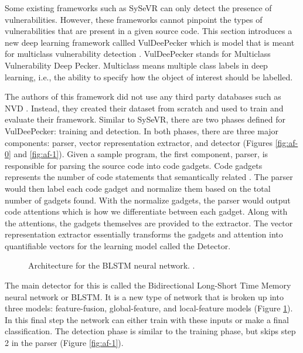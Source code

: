 \documentclass[12pt,twocolumn,letterpaper]{article}
\begin{document}
Some existing frameworks such as SySeVR can only detect the presence of vulnerabilities. However, these 
frameworks cannot pinpoint the types of vulnerabilities that are present in a given source code. This 
section introduces a new deep learning framework callled VulDeePecker which is model that is meant for 
multiclass vulnerability detection \cite{Zou21}.  VulDeePecker stands for Multiclass Vulnerability Deep Pecker.
Multiclass means multiple class labels in deep learning, i.e., the ability to specify how the object of interest 
should be labelled.

The authors of this framework did not use any third party databases such as NVD \cite{Nist00,Zou21}. Instead, 
they created their dataset from scratch and used to train and evaluate their framework. Similar to SySeVR, 
there are two phases defined for VulDeePecker: training and detection. In both phases, there are three major
components: parser, vector representation extractor, and detector (Figures \ref{fig:af-0} and \ref{fig:af-1}). 
Given a sample program, the first component, parser, is responsible for parsing the source code into code gadgets. 
Code gadgets represents the number of code statements that semantically related \cite{Zou21}. The parser would then 
label each code gadget and normalize them based on the total number of gadgets found. With the normalize gadgets, 
the parser would output code attentions which is how we differentiate between each gadget. Along with the attentions,
the gadgets themselves are provided to the extractor. The vector representation extractor essentially transforms the 
gadgets and attention into quantifiable vectors for the learning model called the Detector. 

\begin{figure}[h]
    \centering

    \caption{Architecture for the BLSTM neural network. \cite{Zou21}.}
    \label{fig:af-2}
\end{figure}

The main detector for this is called the Bidirectional Long-Short Time Memory neural network or BLSTM. It 
is a new type of network that is broken up into three models: feature-fusion, global-feature, and local-feature 
models (Figure \ref{fig:af-2}). In this final step the network can either train with these inputs or make 
a final classification. The detection phase is similar to the training phase, but skips step 2 in the parser 
(Figure \ref{fig:af-1}). 
\end{document}
